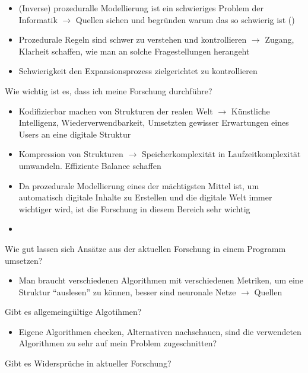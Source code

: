 \begin{itemize}
    \item (Inverse) prozeduralle Modellierung ist ein schwieriges Problem der Informatik $\rightarrow$ Quellen sichen und
    begründen warum das so schwierig ist (\cite{aliaga_2016})
    \item Prozedurale Regeln sind schwer zu verstehen und kontrollieren $\rightarrow$ Zugang, Klarheit schaffen, wie man an
    solche Fragestellungen herangeht
    \item Schwierigkeit den Expansionsprozess zielgerichtet zu kontrollieren~\cite{prusinkiewicz_1990}
\end{itemize}

Wie wichtig ist es, dass ich meine Forschung durchführe?

\begin{itemize}
    \item Kodifizierbar machen von Strukturen der realen Welt $\rightarrow$ Künstliche Intelligenz,  Wiederverwendbarkeit,
    Umsetzten gewisser Erwartungen eines Users an eine digitale Struktur
    \item Kompression von Strukturen $\rightarrow$ Speicherkomplexität in Laufzeitkomplexität umwandeln.
    Effiziente Balance schaffen
    \item Da prozedurale Modellierung eines der mächtigsten Mittel ist, um automatisch digitale Inhalte zu Erstellen und die
    digitale Welt immer wichtiger wird, ist die Forschung in diesem Bereich sehr wichtig
    \item
\end{itemize}

Wie gut lassen sich Ansätze aus der aktuellen Forschung in einem Programm umsetzen?
\begin{itemize}
    \item Man braucht verschiedenen Algorithmen mit verschiedenen Metriken, um eine Struktur "`auslesen"' zu können, besser sind
    neuronale Netze $\rightarrow$ Quellen
\end{itemize}

Gibt es allgemeingültige Algotihmen?

\begin{itemize}
    \item Eigene Algorithmen checken, Alternativen nachschauen, sind die verwendeten Algorithmen zu sehr auf mein Problem
    zugeschnitten?
\end{itemize}

Gibt es Widersprüche in aktueller Forschung?

